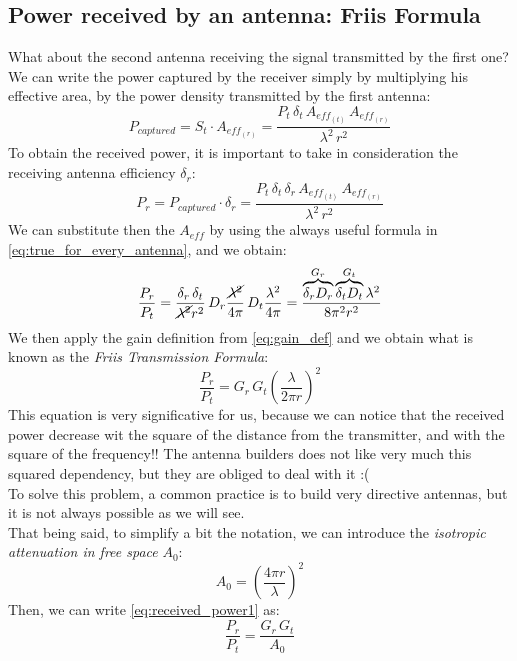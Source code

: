 \subsection*{Power received by an antenna: Friis Formula}
What about the second antenna receiving the signal transmitted by the first one? We can write the power captured by the receiver simply by multiplying his effective area, by the power density transmitted by the first antenna:
\begin{equation}\label{eq:pow_captured}
    P_{captured}=S_t\cdot A_{eff_{(r)}}=\frac{P_t\,\delta_t\,A_{eff_{(t)}}\,A_{eff_{(r)}}}{\lambda^2\,r^2}
\end{equation}
To obtain the received power, it is important to take in consideration the receiving antenna efficiency $\delta_r$:
\begin{equation}
    P_r=P_{captured}\cdot \delta_r=\frac{P_t\,\delta_t\,\delta_r\,A_{eff_{(t)}}\,A_{eff_{(r)}}}{\lambda^2\,r^2}
\end{equation}
We can substitute then the $A_{eff}$ by using the always useful formula in \cref{eq:true_for_every_antenna}, and we obtain:
\begin{equation}
    \frac{P_r}{P_t}=\frac{\delta_r\,\delta_t}{\cancel{\lambda^2}r^2}\,D_r\frac{\cancel{\lambda^2}}{4\pi}\,D_t\frac{\lambda^2}{4\pi}=\frac{\overbrace{\delta_rD_r}^{G_r}\overbrace{\delta_tD_t}^{G_t}\lambda^2}{8\pi^2r^2}
\end{equation}
We then apply the gain definition from \cref{eq:gain_def} and we obtain what is known as the \emph{Friis Transmission Formula}:
\begin{equation}\label{eq:received_power1}
    \frac{P_r}{P_t}=G_r\,G_t\left(\frac{\lambda}{2\pi r}\right)^2
\end{equation}
This equation is very significative for us, because we can notice that the received power decrease wit the square of the distance from the transmitter, and with the square of the frequency!! The antenna builders does not like very much this squared dependency, but they are obliged to deal with it :(\\
To solve this problem, a common practice is to build very directive antennas, but it is not always possible as we will see.\\
That being said, to simplify a bit the notation, we can introduce the \emph{isotropic attenuation in free space} $A_0$:
\begin{equation}\label{eq:isotropic_attenuation}
    A_0=\left(\frac{4\pi r}{\lambda}\right)^2
\end{equation}
Then, we can write \cref{eq:received_power1} as:
\begin{equation}\label{eq:received_power2}
    \frac{P_r}{P_t}=\frac{G_r\,G_t}{A_0}
\end{equation}
